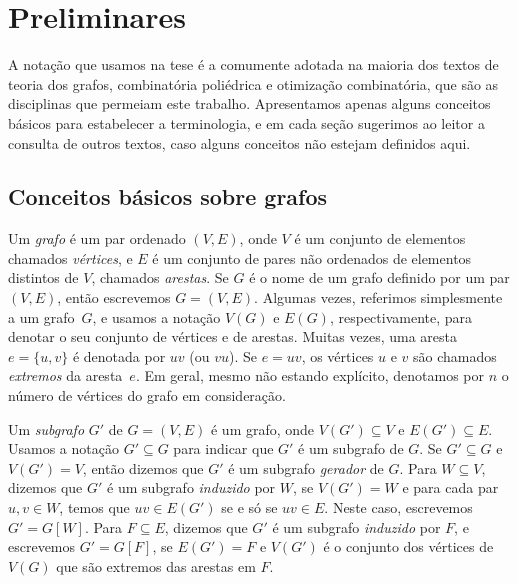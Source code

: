 
\chapter{Preliminares}
\label{cap:preliminares-v2}
A notação que usamos na tese é a comumente adotada na maioria dos textos de teoria dos grafos, combinatória poliédrica e otimização combinatória, que são as  disciplinas que permeiam este trabalho. Apresentamos apenas alguns conceitos básicos para estabelecer a terminologia, e em cada seção sugerimos ao leitor a consulta de outros textos, caso alguns conceitos não estejam definidos aqui.




\section{Conceitos básicos sobre grafos}

Um \emph{grafo} é um par ordenado $(V,E)$, onde $V$ é um conjunto de elementos chamados \emph{vértices}, e $E$ é um conjunto de pares não ordenados de elementos distintos de $V$, chamados \emph{arestas}. Se $G$ é o nome de um grafo definido por um par $(V,E)$, então escrevemos $G=(V,E)$. Algumas vezes, referimos simplesmente a um grafo~$G$, e usamos a notação $V(G)$ e $E(G)$, respectivamente, para denotar o seu conjunto de vértices e de arestas. Muitas vezes, uma aresta $e = \{u,v\}$ é denotada por $uv$ (ou $vu$). Se $e=uv$, os vértices $u$ e $v$ são chamados \emph{extremos} da aresta~$e$. Em geral, mesmo não estando explícito, denotamos por $n$ o número de vértices do grafo em consideração.

Um \emph{subgrafo} $G'$ de $G=(V,E)$ é um grafo, onde
$V(G')\subseteq V$ e $E(G')\subseteq E$. Usamos a notação
$G'\subseteq G$ para indicar que $G'$ é um subgrafo de $G$. Se
$G'\subseteq G$ e $V(G')=V$, então dizemos que $G'$ é um subgrafo
\emph{gerador} de $G$.  Para $W\subseteq V$, dizemos que $G'$ é um
subgrafo \emph{induzido} por $W$, se $V(G')=W$ e para cada par
$u,v \in W$, temos que $uv \in E(G')$ se e só se $uv\in E$. Neste
caso, escrevemos $G' = G[W]$. Para $F \subseteq E$, dizemos que $G'$ é
um subgrafo \emph{induzido} por $F$, e escrevemos $G' = G[F]$, se
$E(G')=F$ e $V(G')$ é o conjunto dos vértices de $V(G)$ que são
extremos das arestas em $F$.

